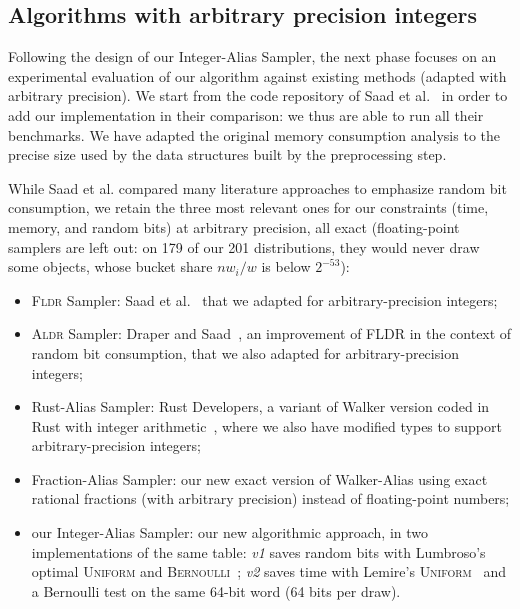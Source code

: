 \subsection{Algorithms with arbitrary precision integers}


Following the design of our Integer-Alias Sampler, the next phase focuses on an experimental evaluation of our algorithm against existing methods (adapted with arbitrary precision). We start from the code repository of Saad et al.~\cite{SFRM19} in order to add our implementation in their comparison: we thus are able to run all their benchmarks. We have adapted the original memory consumption analysis to the precise size used by the data structures built by the preprocessing step.


 While Saad et al. compared many literature approaches to emphasize random bit consumption, we retain the three most relevant ones for our constraints (time, memory, and random bits) at arbitrary precision, all exact (floating-point samplers are left out: on 179 of our 201 distributions, they would never draw some objects, whose bucket share $n w_i/w$ is below $2^{-53}$):
\begin{itemize}
    \item \textsc{Fldr} Sampler: Saad et al.~\cite{SFRM19} that we adapted for arbitrary-precision integers;
    \item \textsc{Aldr} Sampler: Draper and Saad~\cite{DS26}, an improvement of FLDR in the context of random bit consumption, that we also adapted for arbitrary-precision integers;
    \item Rust-Alias Sampler: Rust Developers, a variant of Walker version coded in Rust with integer arithmetic~\cite{Rust25}, where we also have modified types to support arbitrary-precision integers;
    \item Fraction-Alias Sampler: our new exact version of Walker-Alias using exact rational fractions (with arbitrary precision) instead of floating-point numbers;
    \item our Integer-Alias Sampler: our new algorithmic approach, in two implementations of the same table: \emph{v1} saves random bits with Lumbroso's optimal \textsc{Uniform} and \textsc{Bernoulli}~\cite{Lumbroso13}; \emph{v2} saves time with Lemire's \textsc{Uniform}~\cite{Lemire19} and a Bernoulli test on the same 64-bit word (64 bits per draw).
\end{itemize}


